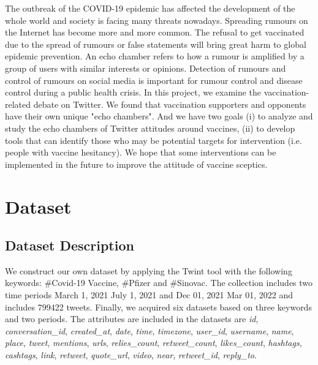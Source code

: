 \documentclass[sigplan,screen]{acmart}
\begin{document}
The outbreak of the COVID-19 epidemic has affected the development of the whole world and society is facing many threats nowadays. Spreading rumours on the Internet has become more and more common. The refusal to get vaccinated due to the spread of rumours or false statements will bring great harm to global epidemic prevention. An echo chamber refers to how a rumour is amplified by a group of users with similar interests or opinions. Detection of rumours and control of rumours on social media is important for rumour control and disease control during a public health crisis. In this project, we examine the vaccination-related debate on Twitter. We found that vaccination supporters and opponents have their own unique "echo chambers". And we have two goals (i) to analyze and study the echo chambers of Twitter attitudes around vaccines, (ii) to develop tools that can identify those who may be potential targets for intervention (i.e. people with vaccine hesitancy). We hope that some interventions can be implemented in the future to improve the attitude of vaccine sceptics.

\section{Dataset}
\subsection{Dataset Description}
We construct our own dataset by applying the Twint tool {\cite{twint}} with the following keywords: \#Covid-19 Vaccine, \#Pfizer and \#Sinovac. The collection includes two time periods  March 1, 2021 \- July 1, 2021 and Dec 01, 2021 \- Mar 01, 2022 and includes 799422 tweets. Finally, we acquired six datasets based on three keywords and two periods. The attributes are included in the datasets are \textit{id}, \textit{conversation\_id}, \textit{created\_at}, \textit{date}, \textit{time}, \textit{timezone}, \textit{user\_id}, \textit{username}, \textit{name}, \textit{place}, \textit{tweet}, \textit{mentions}, \textit{urls}, \textit{relies\_count}, \textit{retweet\_count}, \textit{likes\_count}, \textit{hashtags}, \textit{cashtags}, \textit{link}, \textit{retweet}, \textit{quote\_url}, \textit{video}, \textit{near}, \textit{retweet\_id}, \textit{reply\_to}.
\end{document}

